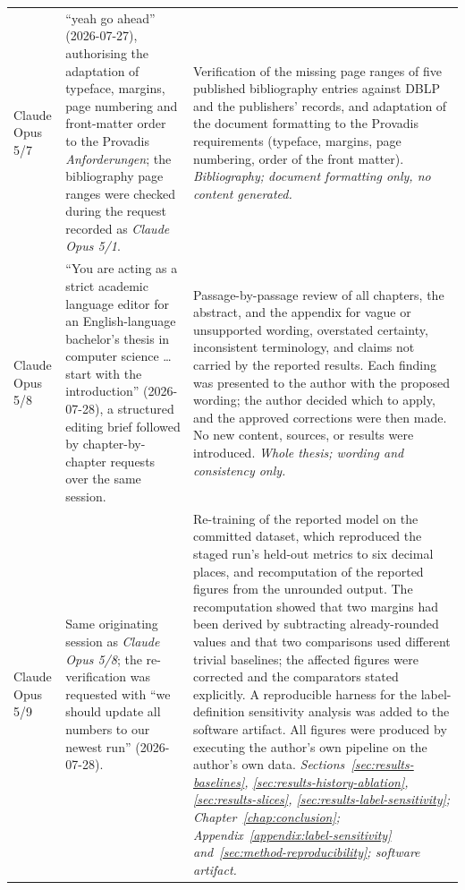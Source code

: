{\begin{longtable}{p{} p{} p{}}
Claude Opus 5/7
& ``yeah go ahead'' (2026-07-27), authorising the adaptation of typeface, margins, page
numbering and front-matter order to the Provadis \emph{Anforderungen}; the bibliography
page ranges were checked during the request recorded as \emph{Claude Opus 5/1}.
& Verification of the missing page ranges of five published bibliography entries against
DBLP and the publishers' records, and adaptation of the document formatting to the
Provadis requirements (typeface, margins, page numbering, order of the front matter).
\newline \emph{Bibliography; document formatting only, no content generated.} \\

Claude Opus 5/8
& ``You are acting as a strict academic language editor for an English-language
bachelor's thesis in computer science \ldots{} start with the introduction''
(2026-07-28), a structured editing brief followed by chapter-by-chapter requests over
the same session.
& Passage-by-passage review of all chapters, the abstract, and the appendix for vague or
unsupported wording, overstated certainty, inconsistent terminology, and claims not
carried by the reported results. Each finding was presented to the author with the
proposed wording; the author decided which to apply, and the approved corrections were
then made. No new content, sources, or results were introduced. \newline
\emph{Whole thesis; wording and consistency only.} \\

Claude Opus 5/9
& Same originating session as \emph{Claude Opus 5/8}; the re-verification was requested
with ``we should update all numbers to our newest run'' (2026-07-28).
& Re-training of the reported model on the committed dataset, which reproduced the staged
run's held-out metrics to six decimal places, and recomputation of the reported figures
from the unrounded output. The recomputation showed that two margins had been derived by
subtracting already-rounded values and that two comparisons used different trivial
baselines; the affected figures were corrected and the comparators stated explicitly. A
reproducible harness for the label-definition sensitivity analysis was added to the
software artifact. All figures were produced by executing the author's own pipeline on
the author's own data. \newline
\emph{Sections~\ref{sec:results-baselines}, \ref{sec:results-history-ablation},
\ref{sec:results-slices}, \ref{sec:results-label-sensitivity};
Chapter~\ref{chap:conclusion}; Appendix~\ref{appendix:label-sensitivity}
and~\ref{sec:method-reproducibility}; software artifact.} \\


\end{longtable}}

